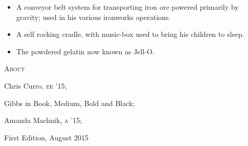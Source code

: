 \documentclass{article}
\begin{document}
\begin{minipage}[t]{0.46\linewidth}
\begin{enumList}
\begin{itemize}[leftmargin=*]
\item A conveyor belt system for transporting iron ore powered primarily by
gravity; used in his various ironworks operations.

\item A self rocking cradle, with music-box used to bring his children to
sleep.

\item The powdered gelatin now known as Jell-O.
\end{itemize}
\end{enumList}

\fontsize{9.5pt}{9.5pt}\selectfont
\upshape
\raggedright
\nocite{*}



\vspace{0.1in}

\scshape \fontsize{16pt}{16pt}\selectfont {} About
\fontsize{10pt}{10pt}\selectfont
\upshape
\raggedright

\begin{description}
\itemsep1pt
\item[Contributors:] Chris Curro, {\scshape ee '15}; 
\item[Typefaces:] Gibbs in Book, Medium, Bold and Black;
\item[Special Thanks:] Amanda Machnik, {\scshape a '15};
\item[Printing:] First Edition, August 2015
\end{description}
\end{minipage}
\end{document}
